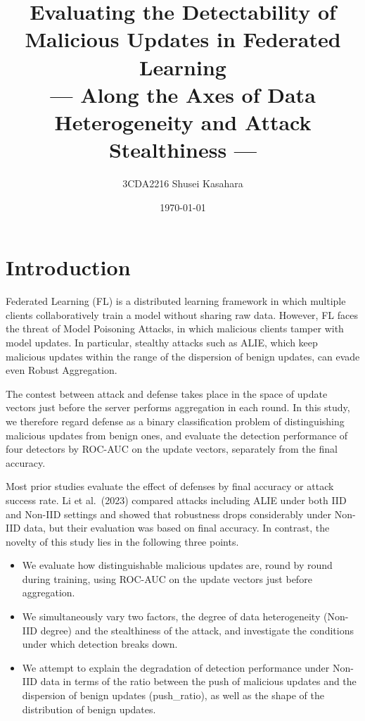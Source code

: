 \documentclass[a4paper,10pt]{article}
\title{
Evaluating the Detectability of Malicious Updates in Federated Learning\\[0.8em]
\large
--- Along the Axes of Data Heterogeneity and Attack Stealthiness ---
}
\author{3CDA2216 Shusei Kasahara}
\date{\today}
\begin{document}
\maketitle

\section{Introduction}

Federated Learning (FL) is a distributed learning framework in which multiple clients collaboratively train a model without sharing raw data\cite{mammen2021fl}. However, FL faces the threat of Model Poisoning Attacks, in which malicious clients tamper with model updates\cite{sagar2023survey}. In particular, stealthy attacks such as ALIE\cite{baruch2019little}, which keep malicious updates within the range of the dispersion of benign updates, can evade even Robust Aggregation.

The contest between attack and defense takes place in the space of update vectors just before the server performs aggregation in each round. In this study, we therefore regard defense as a binary classification problem of distinguishing malicious updates from benign ones, and evaluate the detection performance of four detectors by ROC-AUC on the update vectors, separately from the final accuracy.

Most prior studies evaluate the effect of defenses by final accuracy or attack success rate. Li et al.\ (2023)\cite{li2023experimental} compared attacks including ALIE under both IID and Non-IID settings and showed that robustness drops considerably under Non-IID data, but their evaluation was based on final accuracy. In contrast, the novelty of this study lies in the following three points.
\begin{itemize}
  \item We evaluate how distinguishable malicious updates are, round by round during training, using ROC-AUC on the update vectors just before aggregation.
  \item We simultaneously vary two factors, the degree of data heterogeneity (Non-IID degree) and the stealthiness of the attack, and investigate the conditions under which detection breaks down.
  \item We attempt to explain the degradation of detection performance under Non-IID data in terms of the ratio between the push of malicious updates and the dispersion of benign updates (push\_ratio), as well as the shape of the distribution of benign updates.
\end{itemize}
\end{document}

